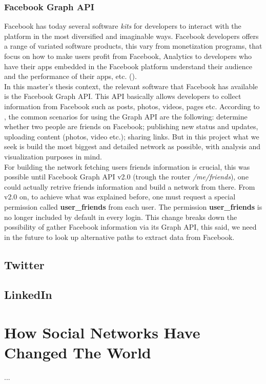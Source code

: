 \subsubsection*{Facebook Graph API}
Facebook has today several software \textit{kits} for developers to interact with the platform in the most diversified and imaginable ways. Facebook developers
offers a range of variated software products, this vary from monetization programs, that focus on how to make users profit from Facebook, Analytics to developers who
have their apps embedded in the Facebook platform understand their audience and the performance of their apps, etc. (\cite{fbproducts}).\\
\indent In this master's thesis context, the relevant software that Facebook has available is the Facebook Graph API. This API basically allows developers to collect information
from Facebook such as posts, photos, videos, pages etc. According to \cite{fbgapi}, the common scenarios for using the Graph API
are the following: determine whether two people are friends on Facebook; publishing new status and updates, uploading content (photos, video etc.); sharing links. But in this project what we seek is
build the most biggest and detailed network as possible, with analysis and visualization purposes in mind.\\
\indent For building the network fetching users friends information is crucial, this was possible until Facebook Graph API v2.0 (trough the router \textit{/me/friends}), one could actually retrive
friends information and build a network from there. From v2.0 on, to achieve what was explained before, one must request a special permission called \textbf{user\_friends}
from each user. The permission \textbf{user\_friends} is no longer included by default in every login. This change breaks down the possibility of gather Facebook information via its Graph API,
this said, we need in the future to look up alternative paths to extract data from Facebook.


\subsection{Twitter}


\subsection{LinkedIn}



\section{How Social Networks Have Changed The World}
...
